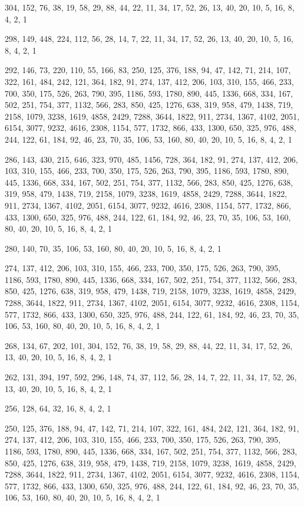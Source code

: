 \documentclass[12pt]{article}
\begin{document}
304, 152, 76, 38, 19, 58, 29, 88, 44, 22, 11, 34, 17, 52, 26, 13, 40, 20, 10, 5, 16, 8, 4, 2, 1

298, 149, 448, 224, 112, 56, 28, 14, 7, 22, 11, 34, 17, 52, 26, 13, 40, 20, 10, 5, 16, 8, 4, 2, 1

292, 146, 73, 220, 110, 55, 166, 83, 250, 125, 376, 188, 94, 47, 142, 71, 214, 107, 322, 161, 484, 242, 121, 364, 182, 91, 274, 137, 412, 206, 103, 310, 155, 466, 233, 700, 350, 175, 526, 263, 790, 395, 1186, 593, 1780, 890, 445, 1336, 668, 334, 167, 502, 251, 754, 377, 1132, 566, 283, 850, 425, 1276, 638, 319, 958, 479, 1438, 719, 2158, 1079, 3238, 1619, 4858, 2429, 7288, 3644, 1822, 911, 2734, 1367, 4102, 2051, 6154, 3077, 9232, 4616, 2308, 1154, 577, 1732, 866, 433, 1300, 650, 325, 976, 488, 244, 122, 61, 184, 92, 46, 23, 70, 35, 106, 53, 160, 80, 40, 20, 10, 5, 16, 8, 4, 2, 1

286, 143, 430, 215, 646, 323, 970, 485, 1456, 728, 364, 182, 91, 274, 137, 412, 206, 103, 310, 155, 466, 233, 700, 350, 175, 526, 263, 790, 395, 1186, 593, 1780, 890, 445, 1336, 668, 334, 167, 502, 251, 754, 377, 1132, 566, 283, 850, 425, 1276, 638, 319, 958, 479, 1438, 719, 2158, 1079, 3238, 1619, 4858, 2429, 7288, 3644, 1822, 911, 2734, 1367, 4102, 2051, 6154, 3077, 9232, 4616, 2308, 1154, 577, 1732, 866, 433, 1300, 650, 325, 976, 488, 244, 122, 61, 184, 92, 46, 23, 70, 35, 106, 53, 160, 80, 40, 20, 10, 5, 16, 8, 4, 2, 1

280, 140, 70, 35, 106, 53, 160, 80, 40, 20, 10, 5, 16, 8, 4, 2, 1

274, 137, 412, 206, 103, 310, 155, 466, 233, 700, 350, 175, 526, 263, 790, 395, 1186, 593, 1780, 890, 445, 1336, 668, 334, 167, 502, 251, 754, 377, 1132, 566, 283, 850, 425, 1276, 638, 319, 958, 479, 1438, 719, 2158, 1079, 3238, 1619, 4858, 2429, 7288, 3644, 1822, 911, 2734, 1367, 4102, 2051, 6154, 3077, 9232, 4616, 2308, 1154, 577, 1732, 866, 433, 1300, 650, 325, 976, 488, 244, 122, 61, 184, 92, 46, 23, 70, 35, 106, 53, 160, 80, 40, 20, 10, 5, 16, 8, 4, 2, 1

268, 134, 67, 202, 101, 304, 152, 76, 38, 19, 58, 29, 88, 44, 22, 11, 34, 17, 52, 26, 13, 40, 20, 10, 5, 16, 8, 4, 2, 1

262, 131, 394, 197, 592, 296, 148, 74, 37, 112, 56, 28, 14, 7, 22, 11, 34, 17, 52, 26, 13, 40, 20, 10, 5, 16, 8, 4, 2, 1

256, 128, 64, 32, 16, 8, 4, 2, 1

250, 125, 376, 188, 94, 47, 142, 71, 214, 107, 322, 161, 484, 242, 121, 364, 182, 91, 274, 137, 412, 206, 103, 310, 155, 466, 233, 700, 350, 175, 526, 263, 790, 395, 1186, 593, 1780, 890, 445, 1336, 668, 334, 167, 502, 251, 754, 377, 1132, 566, 283, 850, 425, 1276, 638, 319, 958, 479, 1438, 719, 2158, 1079, 3238, 1619, 4858, 2429, 7288, 3644, 1822, 911, 2734, 1367, 4102, 2051, 6154, 3077, 9232, 4616, 2308, 1154, 577, 1732, 866, 433, 1300, 650, 325, 976, 488, 244, 122, 61, 184, 92, 46, 23, 70, 35, 106, 53, 160, 80, 40, 20, 10, 5, 16, 8, 4, 2, 1
\end{document}
